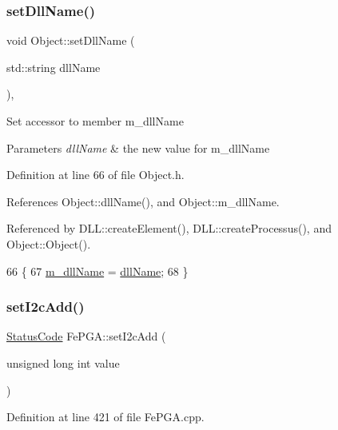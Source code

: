 \subsubsection{\texorpdfstring{set\+Dll\+Name()}{setDllName()}}
{\footnotesize\ttfamily void Object\+::set\+Dll\+Name (\begin{DoxyParamCaption}\item[{std\+::string}]{dll\+Name }\end{DoxyParamCaption})\hspace{0.3cm}{\ttfamily [inline]}, {\ttfamily [inherited]}}

Set accessor to member m\+\_\+dll\+Name 
\begin{DoxyParams}{Parameters}
{\em dll\+Name} & the new value for m\+\_\+dll\+Name \\
\hline
\end{DoxyParams}


Definition at line 66 of file Object.\+h.



References Object\+::dll\+Name(), and Object\+::m\+\_\+dll\+Name.



Referenced by D\+L\+L\+::create\+Element(), D\+L\+L\+::create\+Processus(), and Object\+::\+Object().


\begin{DoxyCode}
66                                       \{
67     \hyperlink{classObject_a01afbeacebb8db6831559972ec362eb3}{m\_dllName} = \hyperlink{classObject_a2e3947f2870094c332d7454117f3ec63}{dllName};
68   \}
\end{DoxyCode}
\mbox{\label{classFePGA_a2da860f836e04ecc54056d0bf8cc8f98}} 
\subsubsection{\texorpdfstring{set\+I2c\+Add()}{setI2cAdd()}}
{\footnotesize\ttfamily \hyperlink{classStatusCode}{Status\+Code} Fe\+P\+G\+A\+::set\+I2c\+Add (\begin{DoxyParamCaption}\item[{unsigned long int}]{value }\end{DoxyParamCaption})}



Definition at line 421 of file Fe\+P\+G\+A.\+cpp.




